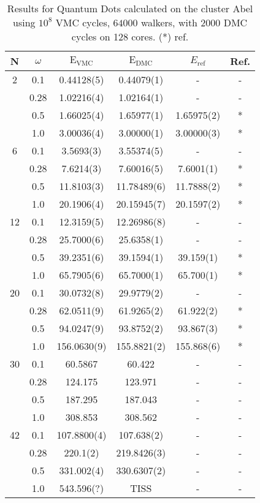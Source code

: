 \begin{table}
\begin{center}
\begin{tabular}{cc|cccc}
    N     & $\omega$ & $\mathrm{E_{VMC}}$ & $\mathrm{E_{DMC}}$ & $E_\mathrm{ref}$ & Ref.\\
\hline\hline
    2     &   0.1    & 0.44128(5) & 0.44079(1)     & - & -\\
          &   0.28   & 1.02216(4) & 1.02164(1)     & - & -\\
          &   0.5    & 1.66025(4) & 1.65977(1)     & 1.65975(2) & *\\
          &   1.0    & 3.00036(4) & 3.00000(1)     & 3.00000(3) & *\\
\hline        
    6     &   0.1    & 3.5693(3)   & 3.55374(5)    & - & - \\
          &   0.28   & 7.6214(3)   & 7.60016(5)    & 7.6001(1) & *\\ 
          &   0.5    & 11.8103(3)  & 11.78489(6)   & 11.7888(2) & *\\
          &   1.0    & 20.1906(4)  & 20.15945(7)   & 20.1597(2) & * \\
\hline
    12    &   0.1    & 12.3159(5)  & 12.26986(8)  & - & -\\
          &   0.28   & 25.7000(6)  & 25.6358(1)   & - & -\\
          &   0.5    & 39.2351(6)  & 39.1594(1)   & 39.159(1) & *\\
          &   1.0    & 65.7905(6)  & 65.7000(1)   & 65.700(1) & *\\
\hline
    20    &   0.1    & 30.0732(8)  & 29.9779(2)  & - & - \\
          &   0.28   & 62.0511(9)  & 61.9265(2)  & 61.922(2) & *\\
          &   0.5    & 94.0247(9)  & 93.8752(2)  & 93.867(3) & * \\
          &   1.0    & 156.0630(9) & 155.8821(2) & 155.868(6) & *\\
\hline
    30    &   0.1    & 60.5867  &  60.422 & - & - \\
          &   0.28   & 124.175  & 123.971 & - & -\\
          &   0.5    & 187.295  & 187.043 & - & -\\
          &   1.0    & 308.853  & 308.562 & - & - \\
\hline
    42    &   0.1    &  107.8800(4)  & 107.638(2)   & - & - \\
          &   0.28   &  220.1(2)     & 219.8426(3)  & - & - \\
          &   0.5    & 331.002(4)    & 330.6307(2)  & - & - \\
          &   1.0    & 543.596(?)    &  TISS        & - & - \\

\end{tabular}
\caption{Results for Quantum Dots calculated on the cluster Abel using $10^8$ VMC cycles, $64000$ walkers, with $2000$ DMC cycles on 128 cores. (*) ref. \cite{MagnusArticle}}
\end{center}
\end{table}


\cite{inf3331}